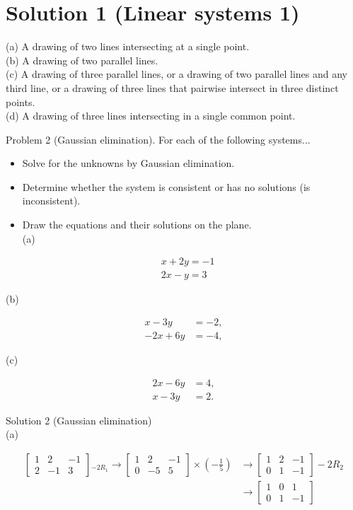 \documentclass[10pt]{article}
\begin{document}
\section*{Solution 1 (Linear systems 1)}
(a) A drawing of two lines intersecting at a single point.\\
(b) A drawing of two parallel lines.\\
(c) A drawing of three parallel lines, or a drawing of two parallel lines and any third line, or a drawing of three lines that pairwise intersect in three distinct points.\\
(d) A drawing of three lines intersecting in a single common point.

Problem 2 (Gaussian elimination). For each of the following systems...

\begin{itemize}
  \item Solve for the unknowns by Gaussian elimination.
  \item Determine whether the system is consistent or has no solutions (is inconsistent).
  \item Draw the equations and their solutions on the plane.\\
(a)
\end{itemize}

$$
\begin{aligned}
& x+2 y=-1 \\
& 2 x-y=3
\end{aligned}
$$

(b)

$$
\begin{aligned}
x-3 y & =-2, \\
-2 x+6 y & =-4,
\end{aligned}
$$

(c)

$$
\begin{aligned}
2 x-6 y & =4, \\
x-3 y & =2 .
\end{aligned}
$$

Solution 2 (Gaussian elimination)\\
(a)

$$
\begin{aligned}
{\left[\begin{array}{cc|c}
1 & 2 & -1 \\
2 & -1 & 3
\end{array}\right]{ }_{-2 R_{1}} \rightarrow\left[\begin{array}{cc|c}
1 & 2 & -1 \\
0 & -5 & 5
\end{array}\right] \times\left(-\frac{1}{5}\right) } & \rightarrow\left[\begin{array}{cc|c}
1 & 2 & -1 \\
0 & 1 & -1
\end{array}\right]-2 R_{2} \\
& \rightarrow\left[\begin{array}{cc|c}
1 & 0 & 1 \\
0 & 1 & -1
\end{array}\right]
\end{aligned}
$$
\end{document}
